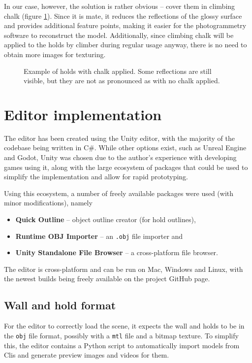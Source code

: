 In our case, however, the solution is rather obvious -- cover them in climbing chalk (figure \ref{fig:chalk}).
Since it is mate, it reduces the reflections of the glossy surface and provides additional feature points, making it easier for the photogrammetry software to reconstruct the model.
Additionally, since climbing chalk will be applied to the holds by climber during regular usage anyway, there is no need to obtain more images for texturing.

\begin{figure}[H]
	\centering
	\hfill
	\hfill
	\caption{Example of holds with chalk applied. Some reflections are still visible, but they are not as pronounced as with no chalk applied.}%
	\label{fig:chalk}
\end{figure}

\section{Editor implementation}
The editor has been created using the Unity editor, with the majority of the codebase being written in C\#.
While other options exist, such as Unreal Engine and Godot, Unity was chosen due to the author's experience with developing games using it, along with the large ecosystem of packages that could be used to simplify the implementation and allow for rapid prototyping.

Using this ecosystem, a number of freely available packages were used (with minor modifications), namely

\begin{itemize}
	\item \textbf{Quick Outline} \cite{quickoutline} -- object outline creator (for hold outlines),
	\item \textbf{Runtime OBJ Importer} \cite{objimport} -- an \verb|.obj| file importer and
	\item \textbf{Unity Standalone File Browser} \cite{unitystandalonefilebrowser} -- a cross-platform file browser.
\end{itemize}

The editor is cross-platform and can be run on Mac, Windows and Linux, with the newest builds being freely available on the project GitHub page.

\subsection{Wall and hold format}
For the editor to correctly load the scene, it expects the wall and holds to be in the \verb|obj| file format, possibly with a \verb|mtl| file and a bitmap texture.
To simplify this, the editor contains a Python script to automatically import models from Clis and generate preview images and videos for them.

